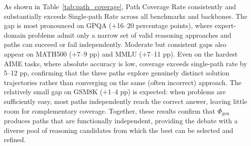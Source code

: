 As shown in Table~\ref{tab:path_coverage}, Path Coverage Rate consistently and substantially exceeds Single-path Rate across all benchmarks and backbones. The gap is most pronounced on GPQA ($+$16--20 percentage points), where expert-domain problems admit only a narrow set of valid reasoning approaches and paths can succeed or fail independently. Moderate but consistent gaps also appear on MATH500 ($+$7--9 pp) and MMLU ($+$7--11 pp). Even on the hardest AIME tasks, where absolute accuracy is low, coverage exceeds single-path rate by 5--12 pp, confirming that the three paths explore genuinely distinct solution trajectories rather than converging on the same (often incorrect) approach. The relatively small gap on GSM8K ($+$1--4 pp) is expected: when problems are sufficiently easy, most paths independently reach the correct answer, leaving little room for complementary coverage. Together, these results confirm that $\Phi_{\text{gen}}$ produces paths that are functionally independent, providing the debate with a diverse pool of reasoning candidates from which the best can be selected and refined.
